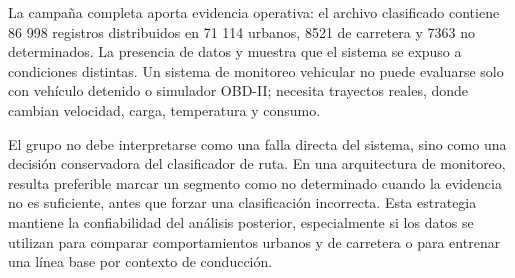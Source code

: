 \documentclass[12pt,letterpaper]{report}
\begin{document}
La campaña completa aporta evidencia operativa: el archivo clasificado contiene 86 998 registros distribuidos en 71 114 urbanos, 8521 de carretera y 7363 no determinados. La presencia de datos  y  muestra que el sistema se expuso a condiciones distintas. Un sistema de monitoreo vehicular no puede evaluarse solo con vehículo detenido o simulador OBD-II; necesita trayectos reales, donde cambian velocidad, carga, temperatura y consumo.

El grupo  no debe interpretarse como una falla directa del sistema, sino como una decisión conservadora del clasificador de ruta. En una arquitectura de monitoreo, resulta preferible marcar un segmento como no determinado cuando la evidencia no es suficiente, antes que forzar una clasificación incorrecta. Esta estrategia mantiene la confiabilidad del análisis posterior, especialmente si los datos se utilizan para comparar comportamientos urbanos y de carretera o para entrenar una línea base por contexto de conducción.
\end{document}
